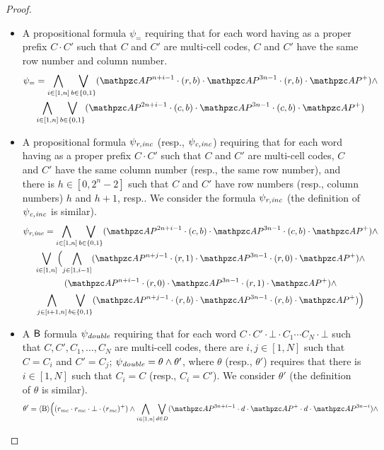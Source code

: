 \begin{proof}
\begin{itemize}
 \item A propositional formula $\psi_=$ requiring that for each word having as a proper prefix $C\cdot C'$ such that $C$ and $C'$ are multi-cell codes,
 $C$ and $C'$ have the same row number and column number.
\begin{multline*}
    \psi_{=}  =  \bigwedge_{i\in [1,n]}\bigvee_{b\in \{0,1\}}(\Prop^{n+i-1}\cdot (r,b) \cdot \Prop^{3n-1}\cdot (r,b)\cdot \Prop^{+})\wedge
    \\
    \bigwedge_{i\in [1,n]}\bigvee_{b\in \{0,1\}}(\Prop^{2n+i-1}\cdot (c,b) \cdot \Prop^{3n-1}\cdot (c,b)\cdot \Prop^{+})
\end{multline*}
 \item A propositional formula $\psi_{\textit{r,inc}}$ (resp., $\psi_{\textit{c,inc}}$) requiring that for each word having as a proper prefix $C\cdot C'$ such that $C$ and $C'$ are multi-cell codes,
 $C$ and $C'$ have the same column number (resp., the same row number), and there is $h\in [0,2^{n}-2]$ such that $C$ and $C'$ have row numbers (resp., column numbers) $h$ and $h+1$, resp.. We consider the formula $\psi_{\textit{r,inc}}$ (the definition of $\psi_{\textit{c,inc}}$ is similar).
\begin{multline*}
    \psi_{\RInc}  = \bigwedge_{i\in [1,n]}\bigvee_{b\in \{0,1\}}(\Prop^{2n+i-1}\cdot (c,b) \cdot \Prop^{3n-1}\cdot (c,b)\cdot \Prop^{+})\wedge
    \\
    \bigvee_{i\in [1,n]}\Bigl(\bigwedge_{j\in [1,i-1]}(\Prop^{n+j-1}\cdot (r,1) \cdot \Prop^{3n-1}\cdot (r,0)\cdot \Prop^{+})\wedge
    \\
     (\Prop^{n+i-1}\cdot (r,0) \cdot \Prop^{3n-1}\cdot (r,1)\cdot \Prop^{+})\wedge
    \\
    \bigwedge_{j\in [i+1,n]} \bigvee_{b\in \{0,1\}}(\Prop^{n+j-1}\cdot (r,b) \cdot \Prop^{3n-1}\cdot (r,b)\cdot \Prop^{+})\Bigr)
\end{multline*}
%
 \item A $\mathsf{B}$ formula $\psi_{\textit{double}}$ requiring that for each word $C\cdot C'\cdot \bot \cdot C_1 \cdots C_N\cdot \bot$ such that
  $C,C',C_1,\ldots,C_N$ are multi-cell codes, there are $i,j\in [1,N]$ such that $C=C_i$ and $C'=C_j$;
  $\psi_{\textit{double}} = \theta \wedge \theta'$, where $\theta$ (resp., $\theta'$) requires that
  there is $i\in [1,N]$ such that $C_i=C$ (resp., $C_i=C'$). We consider $\theta'$ (the definition of $\theta$ is similar).
\begin{multline*}
    \theta'  = \hsB \Bigl((r_{\MC}\cdot r_{\MC} \cdot \bot \cdot (r_{\MC})^{+})\wedge
    \bigwedge_{i\in [1,n]}\bigvee_{d\in D}(\Prop^{3n+i-1}\cdot d \cdot \Prop^{+}\cdot  d\cdot \Prop^{3n-i})\wedge

\end{multline*}
\end{itemize}
\end{proof}
